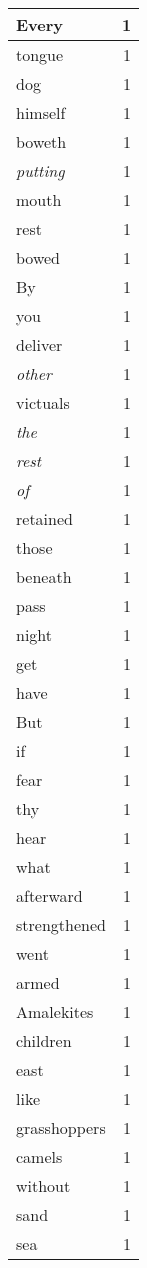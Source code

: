 \begin{center}
\begin{longtable}{l|r}
Every & 1\\ \hline 
tongue & 1\\ \hline 
dog & 1\\ \hline 
himself & 1\\ \hline 
boweth & 1\\ \hline 
\emph{putting} & 1\\ \hline 
mouth & 1\\ \hline 
rest & 1\\ \hline 
bowed & 1\\ \hline 
By & 1\\ \hline 
you & 1\\ \hline 
deliver & 1\\ \hline 
\emph{other} & 1\\ \hline 
victuals & 1\\ \hline 
\emph{the} & 1\\ \hline 
\emph{rest} & 1\\ \hline 
\emph{of} & 1\\ \hline 
retained & 1\\ \hline 
those & 1\\ \hline 
beneath & 1\\ \hline 
pass & 1\\ \hline 
night & 1\\ \hline 
get & 1\\ \hline 
have & 1\\ \hline 
But & 1\\ \hline 
if & 1\\ \hline 
fear & 1\\ \hline 
thy & 1\\ \hline 
hear & 1\\ \hline 
what & 1\\ \hline 
afterward & 1\\ \hline 
strengthened & 1\\ \hline 
went & 1\\ \hline 
armed & 1\\ \hline 
Amalekites & 1\\ \hline 
children & 1\\ \hline 
east & 1\\ \hline 
like & 1\\ \hline 
grasshoppers & 1\\ \hline 
camels & 1\\ \hline 
without & 1\\ \hline 
sand & 1\\ \hline 
sea & 1\\ \hline 

\end{longtable}
\end{center}
